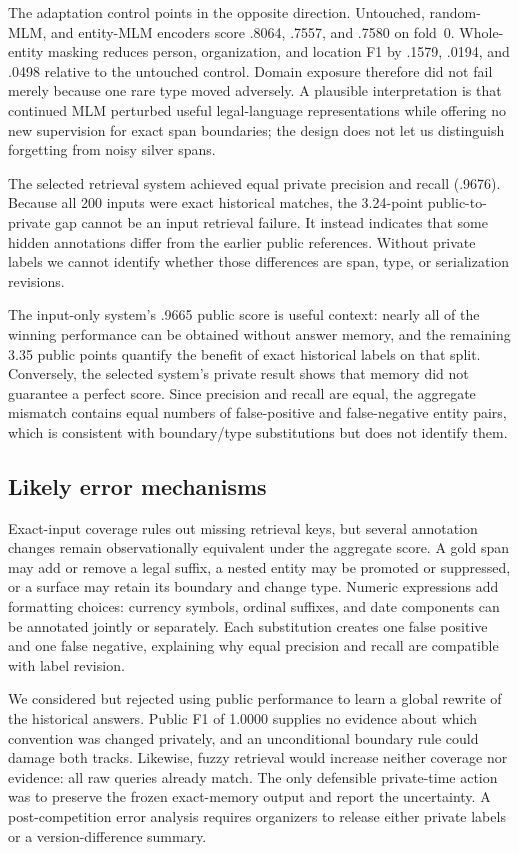 \documentclass[11pt]{article}
\begin{document}
The adaptation control points in the opposite direction.  Untouched,
random-MLM, and entity-MLM encoders score .8064, .7557, and .7580 on fold~0.
Whole-entity masking reduces person, organization, and location F1 by .1579,
.0194, and .0498 relative to the untouched control.  Domain exposure therefore
did not fail merely because one rare type moved adversely.  A plausible
interpretation is that continued MLM perturbed useful legal-language
representations while offering no new supervision for exact span boundaries;
the design does not let us distinguish forgetting from noisy silver spans.

The selected retrieval system achieved equal private precision and recall (.9676). Because all 200 inputs were exact historical matches, the 3.24-point public-to-private gap cannot be an input retrieval failure. It instead indicates that some hidden annotations differ from the earlier public references. Without private labels we cannot identify whether those differences are span, type, or serialization revisions.

The input-only system's .9665 public score is useful context: nearly all of the
winning performance can be obtained without answer memory, and the remaining
3.35 public points quantify the benefit of exact historical labels on that
split.  Conversely, the selected system's private result shows that memory did
not guarantee a perfect score.  Since precision and recall are equal, the
aggregate mismatch contains equal numbers of false-positive and false-negative
entity pairs, which is consistent with boundary/type substitutions but does not
identify them.

\subsection{Likely error mechanisms}
Exact-input coverage rules out missing retrieval keys, but several annotation
changes remain observationally equivalent under the aggregate score.  A gold
span may add or remove a legal suffix, a nested entity may be promoted or
suppressed, or a surface may retain its boundary and change type.  Numeric
expressions add formatting choices: currency symbols, ordinal suffixes, and
date components can be annotated jointly or separately.  Each substitution
creates one false positive and one false negative, explaining why equal
precision and recall are compatible with label revision.

We considered but rejected using public performance to learn a global rewrite
of the historical answers.  Public F1 of 1.0000 supplies no evidence about
which convention was changed privately, and an unconditional boundary rule
could damage both tracks.  Likewise, fuzzy retrieval would increase neither
coverage nor evidence: all raw queries already match.  The only defensible
private-time action was to preserve the frozen exact-memory output and report
the uncertainty.  A post-competition error analysis requires organizers to
release either private labels or a version-difference summary.
\end{document}
